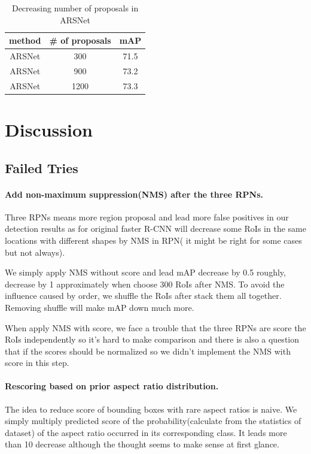\documentclass[10pt,twocolumn,letterpaper]{article}
\begin{document}
\begin{table}[ht]
\label{Exp2}
\caption{Decreasing number of proposals in ARSNet}
\centering
\begin{tabular}{|c|c|c|}
\hline 
 method & \# of proposals & mAP
\\ \hline 
 ARSNet & 300 & 71.5
\\ \hline 
 ARSNet & 900 & 73.2
\\ \hline 
 ARSNet & 1200 & 73.3
\\ \hline
\end{tabular}
\end{table}








\section{Discussion}
\subsection{Failed Tries}
\paragraph{Add non-maximum suppression(NMS) after the three RPNs.} Three RPNs means more region proposal and lead more false positives in our detection results as for original faster R-CNN will decrease some RoIs in the same locations with different shapes by NMS in RPN( it might be right for some cases but not always).

We simply apply NMS without score and lead mAP decrease by 0.5 roughly, decrease by 1 approximately when choose 300 RoIs after NMS. To avoid the influence caused by order, we shuffle the RoIs after stack them all together. Removing shuffle will make mAP down much more.

When apply NMS with score, we face a trouble that the three RPNs are score the RoIs independently so it’s hard to make comparison and there is also a question that if the scores should be normalized so we didn’t implement the NMS with score in this step.

\paragraph{Rescoring based on prior aspect ratio distribution.} The idea to reduce score of bounding boxes with rare aspect ratios is naive. We simply multiply predicted score of the probability(calculate from the statistics of dataset) of the aspect ratio occurred in its corresponding class. It leads more than 10 decrease although the thought seems to make sense at first glance.
 
\end{document}
